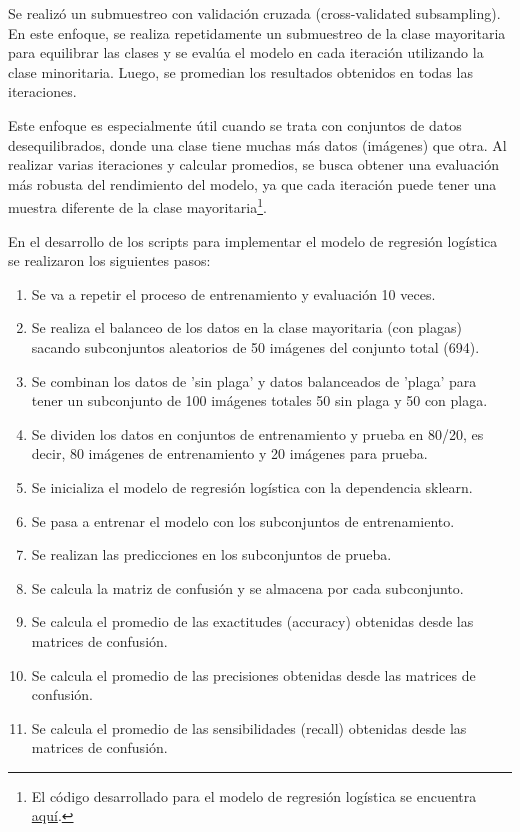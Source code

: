 \newpage

Se realizó un submuestreo con validación cruzada (cross-validated subsampling). En este enfoque, se realiza repetidamente un submuestreo de la clase mayoritaria para equilibrar las clases y se evalúa el modelo en cada iteración utilizando la clase minoritaria. Luego, se promedian los resultados obtenidos en todas las iteraciones.

Este enfoque es especialmente útil cuando se trata con conjuntos de datos desequilibrados, donde una clase tiene muchas más datos (imágenes) que otra. Al realizar varias iteraciones y calcular promedios, se busca obtener una evaluación más robusta del rendimiento del modelo, ya que cada iteración puede tener una muestra diferente de la clase mayoritaria\footnote{El código desarrollado para el modelo de regresión logística se encuentra \href{https://github.com/juferoto/mlops_project/blob/master/notebooks/modeloRegresion.ipynb}{aquí}.}.

En el desarrollo de los scripts para implementar el modelo de regresión logística se realizaron los siguientes pasos:

\begin{enumerate}
    \item Se va a repetir el proceso de entrenamiento y evaluación 10 veces.
    \item Se realiza el balanceo de los datos en la clase mayoritaria (con plagas) sacando subconjuntos aleatorios de 50 imágenes del conjunto total (694).
    \item Se combinan los datos de 'sin plaga' y datos balanceados de 'plaga’ para tener un subconjunto de 100 imágenes totales 50 sin plaga y 50 con plaga.
    \item Se dividen los datos en conjuntos de entrenamiento y prueba en 80/20, es decir, 80 imágenes de entrenamiento y 20 imágenes para prueba.
    \item Se inicializa el modelo de regresión logística con la dependencia sklearn.
    \item Se pasa a entrenar el modelo con los subconjuntos de entrenamiento.
    \item Se realizan las predicciones en los subconjuntos de prueba.
    \item Se calcula la matriz de confusión y se almacena por cada subconjunto.
    \item Se calcula el promedio de las exactitudes (accuracy) obtenidas desde las matrices de confusión.
    \item Se calcula el promedio de las precisiones obtenidas desde las matrices de confusión.
    \item Se calcula el promedio de las sensibilidades (recall) obtenidas desde las matrices de confusión.
\end{enumerate}

